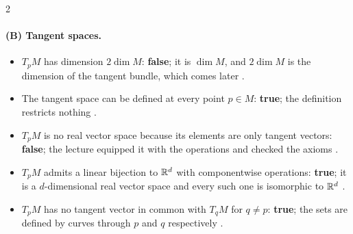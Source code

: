 \begin{paracol}{2}
\paragraph{(B) Tangent spaces.}
\begin{itemize}
  \item $T_pM$ has dimension $2\dim M$: \textbf{false}; it is $\dim M$, and $2\dim M$ is the dimension of the tangent bundle, which comes later .
  \item The tangent space can be defined at every point $p\in M$: \textbf{true}; the definition restricts nothing .
  \item $T_pM$ is no real vector space because its elements are only tangent vectors: \textbf{false}; the lecture equipped it with the operations and checked the axioms .
  \item $T_pM$ admits a linear bijection to $\mathbb{R}^d$ with componentwise operations: \textbf{true}; it is a $d$-dimensional real vector space and every such one is isomorphic to $\mathbb{R}^d$ .
  \item $T_pM$ has no tangent vector in common with $T_qM$ for $q\neq p$: \textbf{true}; the sets are defined by curves through $p$ and $q$ respectively .
\end{itemize}


\end{paracol}
